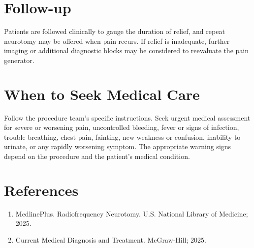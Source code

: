 \section*{Follow-up}
Patients are followed clinically to gauge the duration of relief, and repeat neurotomy may be offered when pain recurs. If relief is inadequate, further imaging or additional diagnostic blocks may be considered to reevaluate the pain generator.

\section*{When to Seek Medical Care}
Follow the procedure team's specific instructions. Seek urgent medical assessment for severe or worsening pain, uncontrolled bleeding, fever or signs of infection, trouble breathing, chest pain, fainting, new weakness or confusion, inability to urinate, or any rapidly worsening symptom. The appropriate warning signs depend on the procedure and the patient's medical condition.

\section*{References}
\begin{enumerate}
  \item MedlinePlus. Radiofrequency Neurotomy. U.S. National Library of Medicine; 2025.
  \item Current Medical Diagnosis and Treatment. McGraw-Hill; 2025.
\end{enumerate}

\clearpage
